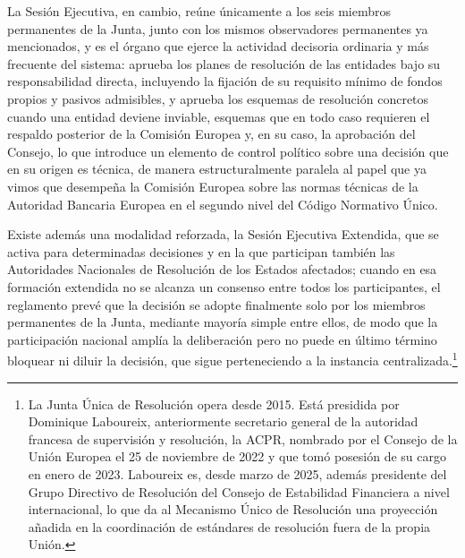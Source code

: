 \documentclass[10pt,a4paper]{article}
\begin{document}
{La Sesión Ejecutiva, en cambio, reúne únicamente a los seis miembros permanentes de la Junta, junto con los mismos observadores permanentes ya mencionados, y es el órgano que ejerce la actividad decisoria ordinaria y más frecuente del sistema: aprueba los planes de resolución de las entidades bajo su responsabilidad directa, incluyendo la fijación de su requisito mínimo de fondos propios y pasivos admisibles, y aprueba los esquemas de resolución concretos cuando una entidad deviene inviable, esquemas que en todo caso requieren el respaldo posterior de la Comisión Europea y, en su caso, la aprobación del Consejo, lo que introduce un elemento de control político sobre una decisión que en su origen es técnica, de manera estructuralmente paralela al papel que ya vimos que desempeña la Comisión Europea sobre las normas técnicas de la Autoridad Bancaria Europea en el segundo nivel del Código Normativo Único. 

Existe además una modalidad reforzada, la Sesión Ejecutiva Extendida, que se activa para determinadas decisiones y en la que participan también las Autoridades Nacionales de Resolución de los Estados afectados; cuando en esa formación extendida no se alcanza un consenso entre todos los participantes, el reglamento prevé que la decisión se adopte finalmente solo por los miembros permanentes de la Junta, mediante mayoría simple entre ellos, de modo que la participación nacional amplía la deliberación pero no puede en último término bloquear ni diluir la decisión, que sigue perteneciendo a la instancia centralizada.\footnote{%
    La Junta Única de Resolución opera desde 2015. Está presidida por Dominique Laboureix, anteriormente secretario general de la autoridad francesa de supervisión y resolución, la ACPR, nombrado por el Consejo de la Unión Europea el 25 de noviembre de 2022 y que tomó posesión de su cargo en enero de 2023. Laboureix es, desde marzo de 2025, además presidente del Grupo Directivo de Resolución del Consejo de Estabilidad Financiera a nivel internacional, lo que da al Mecanismo Único de Resolución una proyección añadida en la coordinación de estándares de resolución fuera de la propia Unión.
}

}
\end{document}
